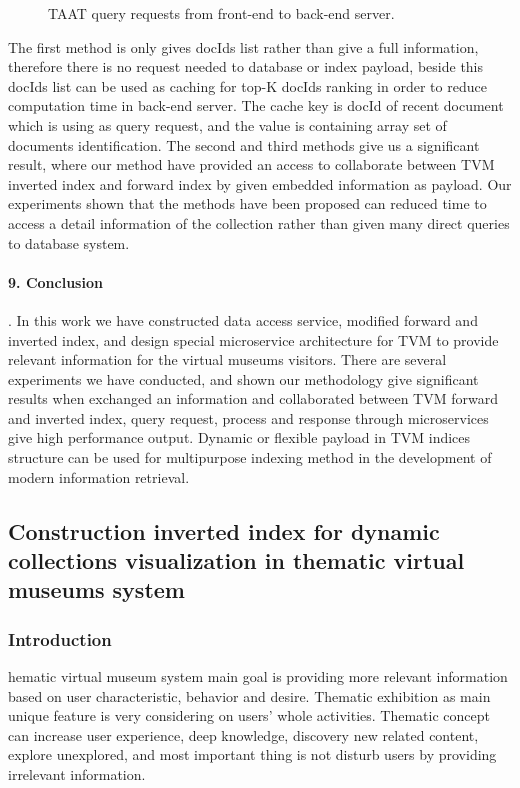 \begin{figure}[ht]
	\caption{TAAT query requests from front-end to back-end server.}\label{fig:taatQuery}
\end{figure}

The first method is only gives docIds list rather than give a full information, therefore there is no request needed to database or index payload, beside this docIds list can be used as caching for top-K docIds ranking in order to reduce computation time in back-end server. The cache key is docId of recent document which is using as query request, and the value is containing array set of documents identification. The second and third methods give us a significant result, where our method have provided an access to collaborate between TVM inverted index and forward index by given embedded information as payload. Our experiments shown that the methods have been proposed can reduced time to access a detail information of the collection rather than given many direct queries to database system.

\paragraph{9. Conclusion}. In this work we have constructed data access service, modified forward and inverted index, and design special microservice architecture for TVM to provide relevant information for the virtual museums visitors. There are several experiments we have conducted, and shown our methodology give significant results when exchanged an information and collaborated between TVM forward and inverted index, query request, process and response through microservices give high performance output. Dynamic or flexible payload in TVM indices structure can be used for multipurpose indexing method in the development of modern information retrieval.

\subsection{Construction inverted index for dynamic collections visualization in thematic virtual museums system}\label{subsec:ch4/sec2/sub2}

\subsubsection{Introduction}

hematic virtual museum system main goal is providing more relevant information based on user characteristic, behavior and desire. Thematic exhibition as main unique feature is very considering on users’ whole activities. Thematic concept can increase user experience, deep knowledge, discovery new related content, explore unexplored, and most important thing is not disturb users by providing irrelevant information.

